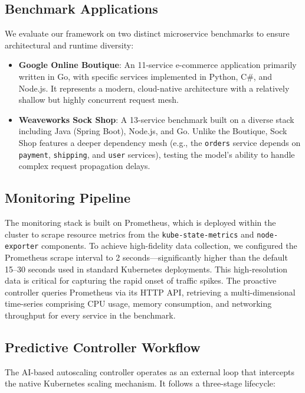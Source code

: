 \documentclass[conference]{IEEEtran}
\begin{document}
\subsection{Benchmark Applications}
We evaluate our framework on two distinct microservice benchmarks to ensure architectural and runtime diversity:

\begin{itemize}
    \item \textbf{Google Online Boutique}: An 11-service e-commerce application primarily written in Go, with specific services implemented in Python, C\#, and Node.js. It represents a modern, cloud-native architecture with a relatively shallow but highly concurrent request mesh.
    \item \textbf{Weaveworks Sock Shop}: A 13-service benchmark built on a diverse stack including Java (Spring Boot), Node.js, and Go. Unlike the Boutique, Sock Shop features a deeper dependency mesh (e.g., the \texttt{orders} service depends on \texttt{payment}, \texttt{shipping}, and \texttt{user} services), testing the model's ability to handle complex request propagation delays.
\end{itemize}

\subsection{Monitoring Pipeline}
The monitoring stack is built on Prometheus, which is deployed within the cluster to scrape resource metrics from the \texttt{kube-state-metrics} and \texttt{node-exporter} components. To achieve high-fidelity data collection, we configured the Prometheus scrape interval to 2 seconds—significantly higher than the default 15--30 seconds used in standard Kubernetes deployments. This high-resolution data is critical for capturing the rapid onset of traffic spikes. The proactive controller queries Prometheus via its HTTP API, retrieving a multi-dimensional time-series comprising CPU usage, memory consumption, and networking throughput for every service in the benchmark.

\subsection{Predictive Controller Workflow}
The AI-based autoscaling controller operates as an external loop that intercepts the native Kubernetes scaling mechanism. It follows a three-stage lifecycle:
\end{document}
